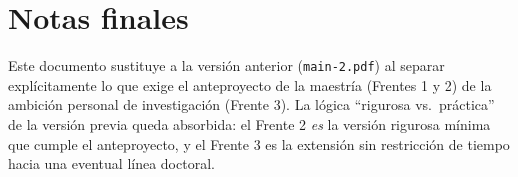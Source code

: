 \documentclass[11pt]{article}
\begin{document}
\section{Notas finales}

Este documento sustituye a la versión anterior (\texttt{main-2.pdf}) al separar
explícitamente lo que exige el anteproyecto de la maestría (Frentes 1 y 2) de la
ambición personal de investigación (Frente 3). La lógica ``rigurosa vs.\ práctica''
de la versión previa queda absorbida: el Frente 2 \emph{es} la versión rigurosa
mínima que cumple el anteproyecto, y el Frente 3 es la extensión sin restricción de
tiempo hacia una eventual línea doctoral.
\end{document}

